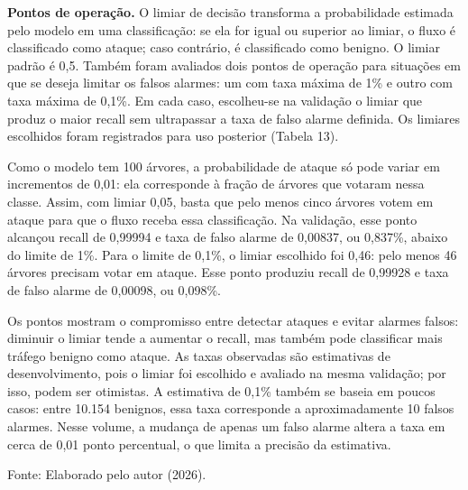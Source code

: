 \documentclass[
    12pt,                %
    openright,           %
    oneside,             %
    a4paper,             %
    english,             %
    brazil               %
]{abntex2}
\begin{document}
\textbf{Pontos de operação.} O limiar de decisão transforma a probabilidade estimada pelo modelo em uma classificação: se ela for igual ou superior ao limiar, o fluxo é classificado como ataque; caso contrário, é classificado como benigno. O limiar padrão é 0,5. Também foram avaliados dois pontos de operação para situações em que se deseja limitar os falsos alarmes: um com taxa máxima de 1\% e outro com taxa máxima de 0,1\%. Em cada caso, escolheu-se na validação o limiar que produz o maior recall sem ultrapassar a taxa de falso alarme definida. Os limiares escolhidos foram registrados para uso posterior (Tabela 13).

Como o modelo tem 100 árvores, a probabilidade de ataque só pode variar em incrementos de 0,01: ela corresponde à fração de árvores que votaram nessa classe. Assim, com limiar 0,05, basta que pelo menos cinco árvores votem em ataque para que o fluxo receba essa classificação. Na validação, esse ponto alcançou recall de 0,99994 e taxa de falso alarme de 0,00837, ou 0,837\%, abaixo do limite de 1\%. Para o limite de 0,1\%, o limiar escolhido foi 0,46: pelo menos 46 árvores precisam votar em ataque. Esse ponto produziu recall de 0,99928 e taxa de falso alarme de 0,00098, ou 0,098\%.

Os pontos mostram o compromisso entre detectar ataques e evitar alarmes falsos: diminuir o limiar tende a aumentar o recall, mas também pode classificar mais tráfego benigno como ataque. As taxas observadas são estimativas de desenvolvimento, pois o limiar foi escolhido e avaliado na mesma validação; por isso, podem ser otimistas. A estimativa de 0,1\% também se baseia em poucos casos: entre 10.154 benignos, essa taxa corresponde a aproximadamente 10 falsos alarmes. Nesse volume, a mudança de apenas um falso alarme altera a taxa em cerca de 0,01 ponto percentual, o que limita a precisão da estimativa.

\begin{table}
\centering
\caption{Recall com taxa de falso alarme fixa (validação)}
\label{tab:recall-falso-alarme-fixo}
\par\smallskip
Fonte: Elaborado pelo autor (2026).
\end{table}
\end{document}
